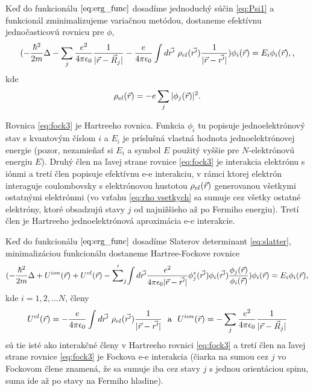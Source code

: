 Keď do funkcionálu $\eqref{eq:erg_func}$ dosadíme jednoduchý súčin \eqref{eq:Psi1} a funkcionál zminimalizujeme variačnou metódou,
dostaneme efektívnu jednočasticovú rovnicu pre $\phi$,
\begin{equation}
\label{eq:fock3}
(-\frac{\hbar^2}{2m}\Delta -\sum_j\frac{e^2}{4\pi \epsilon_0}{\frac{1}{|\vec{r}-\vec{R}_j|}} -\frac{e}{4\pi \epsilon_0} \int d\vec{r'}\ \rho_{el}(\vec{r'}) \frac {1}{|\vec{r}-\vec{r'}|})\phi_i({\vec{r}})=E_i\phi_i(\vec{r}), \text{,}
\end{equation}
kde
\begin{equation}
\label{eq:rho vsetkych}
\rho_{el}(\vec{r})=-e \sum_j |\phi_j(\vec{r})|^2 \text{.}
\end{equation}

Rovnica \eqref{eq:fock3} je Hartreeho rovnica. Funkcia $\phi_i$ tu popisuje jednoelektrónový stav s kvantovým číslom $i$ a $E_i$ je príslušná vlastná hodnota jednoelektrónovej energie (pozor, nezamieňať si $E_i$ a symbol $E$ použitý vyššie pre $N$-elektrónovú energiu $E$).
Druhý člen na ľavej strane rovnice \eqref{eq:fock3} je interakcia elektrónu s iónmi a tretí člen popisuje efektívnu e-e interakciu, v rámci ktorej elektrón interaguje coulombovsky s elektrónovou hustotou $\rho_{el}(\vec{r})$ generovanou
všetkymi ostatnými elektrónmi (vo vzťahu \eqref{eq:rho vsetkych} sa sumuje cez všetky ostatné elektróny, ktoré obsadzujú stavy $j$ od najnižšieho až po Fermiho energiu). Tretí člen je Hartreeho jednoelektrónová aproximácia e-e interakcie.

Keď do funkcionálu $\eqref{eq:erg_func}$ dosadíme Slaterov determinant \eqref{eq:slatter}, minimalizáciou funkcionálu dostaneme
Hartree-Fockove rovnice
\begin{equation}
\label{eq:fock3}
(-\frac{\hbar^2}{2m}\Delta +U^{ion}(\vec{r})+U^{el}(\vec{r})-
{\sum'}_j{\int d\vec{r'}\frac{e^2}{4\pi \epsilon_0|\vec{r}-\vec{r'}|}
\phi_j^{*}(\vec{r'})\phi_i(\vec{r'})\frac{\phi_j(\vec{r})}{\phi_i(\vec{r})}})\phi_i({\vec{r}})=E_i\phi_i(\vec{r}) \text{,}
\end{equation}
kde $i = 1, 2, \dots N$, členy
\begin{equation}
\label{eq:hartree a ion}
U^{el}(\vec{r}) = -\frac{e}{4\pi \epsilon_0} \int d\vec{r'}\ \rho_{el}(\vec{r'}) \frac {1}{|\vec{r}-\vec{r'}|} \ \  \text{a} \ \  U^{ion}(\vec{r}) = -\sum_j\frac{e^2}{4\pi \epsilon_0}{\frac{1}{|\vec{r}-\vec{R}_j|}}
\end{equation}
sú tie isté ako interakčné členy v Hartreeho rovnici \eqref{eq:fock3} a tretí člen na ľavej strane rovnice \eqref{eq:fock3}
je Fockova e-e interakcia (čiarka na sumou cez $j$ vo Fockovom člene znamená, že sa sumuje iba cez stavy $j$ s jednou orientáciou spinu, suma ide až po stavy na Fermiho hladine).

